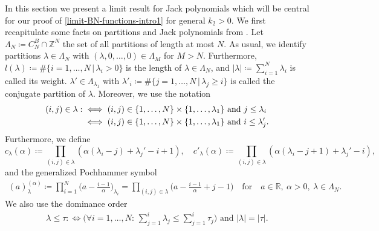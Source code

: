 \documentclass[reqno]{amsart}
\theoremstyle{plain}
\theoremstyle{definition}
\numberwithin{equation}{section}
\newcommand{\R}{\mathbb{R}}
\newcommand{\Z}{\mathbb{Z}}
\begin{document}
In this section we present a limit result for Jack polynomials which will 
 be  central for our proof of  \eqref{limit-BN-functions-intro1} 
 for general $k_2>0$.
We first recapitulate some facts on partitions and Jack polynomials from  \cite{M, S, DES}.
 Let $\Lambda_N \coloneqq C_N^B \cap \Z^N$  the set of all partitions of length at most $N$.
 As usual, we identify partitions $\lambda \in \Lambda_N$ with $(\lambda,0,\ldots,0)\in\Lambda_{M} $ for  $M > N$.
Furthermore, $l(\lambda) \coloneqq \#\{i=1,\ldots,N \, | \, \lambda_i>0\}$ is the length of $\lambda\in \Lambda_N$, and
$|\lambda| \coloneqq \sum\limits_{i=1}^N \lambda_i$ is called its weight. 
$\lambda' \in \Lambda_{\lambda_1}$ with $\lambda'_i \coloneqq \#\{j=1,\ldots,N \, | \, \lambda_j \geq i \}$
is called the conjugate partition of $\lambda$.
Moreover, we use the notation
\begin{align}\label{def-pairs}
(i,j) \in \lambda 
:&\iff (i,j) \in \{1,\ldots,N\} \times \{1,\ldots,\lambda_1\} \text { and } j \leq \lambda_i \\
&\iff (i,j) \in \{1,\ldots,N\} \times \{1,\ldots,\lambda_1\} \text { and } i \leq \lambda_j'. \notag
\end{align}
Furthermore, we define
\begin{equation}\label{def-c-lambda}
c_{\lambda}(\alpha) \coloneqq \prod\limits_{(i,j) \in \lambda} (\alpha(\lambda_i-j)+\lambda_j'-i+1), \quad
c'_{\lambda}(\alpha) \coloneqq \prod\limits_{(i,j) \in \lambda} (\alpha(\lambda_i-j+1)+\lambda_j'-i),
\end{equation}
and  the generalized Pochhammer symbol
\begin{align*}
(a)_{\lambda}^{(\alpha)} 
\coloneqq \prod\limits_{i=1}^N \Big(a-\frac{i-1}{\alpha}\Big)_{\lambda_i}
= \prod\limits_{(i,j)\in\lambda}\Big(a-\frac{i-1}{\alpha}+j-1\Big) \quad \text{for}\quad a\in\R,\> \alpha>0,\> \lambda\in\Lambda_N.
\end{align*}
We also use the dominance order
\begin{align*}\lambda \leq \tau :\iff \bigg(\forall{i=1,\ldots,N:} \, \sum\limits_{j=1}^i \lambda_j \leq \sum\limits_{j=1}^i \tau_j \bigg) \text{ and } |\lambda|=|\tau|.
\end{align*}
\end{document}
